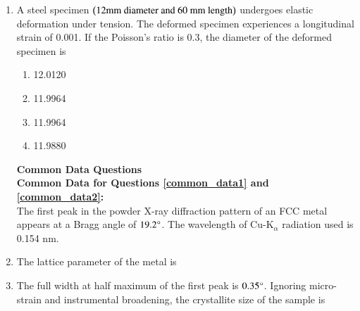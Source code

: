 \documentclass[journal]{IEEEtran}
\begin{document}
\begin{enumerate}
\item A steel specimen $\left(12 \text{mm diameter and}\ 60 \ \text{mm length}\right)$ undergoes elastic deformation under tension. The deformed specimen experiences a longitudinal strain of 0.001. If the Poisson's ratio is 0.3, the diameter of the deformed specimen  is 
\begin{multicols}{4}
\begin{enumerate}
    \item 12.0120
    \item 11.9964
    \item 11.9964
    \item 11.9880
\end{enumerate}
\end{multicols}

\textbf{Common Data Questions}\\
\textbf{Common Data for Questions \ref{common_data1} and \ref{common_data2}:}\\
 The first peak in the powder X-ray diffraction pattern of an FCC metal appears at a Bragg angle of $19.2\degree$. The wavelength of Cu-K$_{\alpha}$ radiation used is 0.154 nm.\\
\item\label{common_data1} The lattice parameter of the metal  is
\begin{enumerate}
\end{enumerate}


\item\label{common_data2} The full width at half maximum  of the first peak is $0.35\degree$.
 Ignoring micro-strain and instrumental broadening, the crystallite size of the sample  is 
\begin{enumerate}
\end{enumerate}


\end{enumerate}
\end{document}
